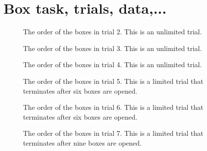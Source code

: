 \appendix
\chapter{Box task, trials, data,...}
\label{appendix_a}

\begin{figure}
    \centering
    \scalebox{0.8}{}
    \caption[Order of boxes in trial 2]{The order of the boxes in trial 2. This is an unlimited trial.}
    \label{fig:trial2_order_appendix}
\end{figure}

\begin{figure}
    \centering
    \scalebox{0.8}{}
    \caption[Order of boxes in trial 3]{The order of the boxes in trial 3. This is an unlimited trial.}
    \label{fig:trial3_order_appendix}
\end{figure}

\begin{figure}
    \centering
    \scalebox{0.8}{}
    \caption[Order of boxes in trial 4]{The order of the boxes in trial 4. This is an unlimited trial.}
    \label{fig:trial4_order}
\end{figure}


\begin{figure}
    \centering
    \scalebox{0.8}{}
    \caption[Order of boxes in trial 5]{The order of the boxes in trial 5. This is a limited trial that terminates after six boxes are opened.}
    \label{fig:trial5_order_appendix}
\end{figure}

\begin{figure}
    \centering
    \scalebox{0.8}{}
    \caption[Order of boxes in trial 6]{The order of the boxes in trial 6. This is a limited trial that terminates after six boxes are opened.}
    \label{fig:trial6_order}
\end{figure}

\begin{figure}
    \centering
    \scalebox{0.8}{}
    \caption[Order of boxes in trial 7]{The order of the boxes in trial 7. This is a limited trial that terminates after nine boxes are opened.}
    \label{fig:trial7_order}
\end{figure}

